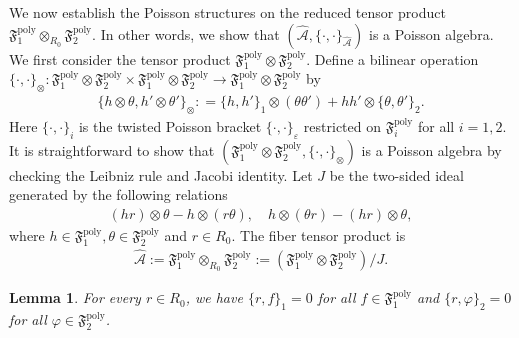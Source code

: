 \documentclass[11pt]{amsart}
\newtheorem{lemma}[theorem]{Lemma}
\theoremstyle{definition}
\theoremstyle{plain}
\theoremstyle{conclusion}
\begin{document}
We now establish the Poisson structures on the reduced tensor product $\mathfrak{F}_1^{\mathrm{poly}} \otimes_{R_0} \mathfrak{F}_2^{\mathrm{poly}}$. In other words, we show that $(\widehat{\mathcal{A}},\{\cdot,\cdot\}_{\widehat{\mathcal{A}}})$ is a Poisson algebra. We first consider the tensor product $\mathfrak{F}_1^{\mathrm{poly}} \otimes \mathfrak{F}_2^{\mathrm{poly}}$. Define a bilinear operation  $ \{\cdot,\cdot\}_{\otimes}:  \mathfrak{F}_1^{\mathrm{poly}} \otimes \mathfrak{F}_2^{\mathrm{poly}} \times \mathfrak{F}_1^{\mathrm{poly}} \otimes \mathfrak{F}_2^{\mathrm{poly}} \rightarrow \mathfrak{F}_1^{\mathrm{poly}} \otimes \mathfrak{F}_2^{\mathrm{poly}}$   by \begin{align*}
    \{ h \otimes \theta,h' \otimes \theta'\}_\otimes : = \{h,h'\}_1 \otimes (\theta \theta' ) +  hh' \otimes \{\theta,\theta'\}_2. 
\end{align*} Here $\{\cdot,\cdot\}_i$ is the twisted Poisson bracket $\{\cdot,\cdot\}_\varepsilon$ restricted on $\mathfrak{F}_i^{\mathrm{poly}}$ for all $i =1,2$. %
It is straightforward to show that $\left(\mathfrak{F}_1^{\mathrm{poly}} \otimes \mathfrak{F}_2^{\mathrm{poly}}, \{\cdot,\cdot\}_\otimes\right)$ is a Poisson algebra by checking the Leibniz rule and Jacobi identity. Let $J$ be the two-sided ideal generated by the following relations \begin{align}
    (hr) \otimes \theta - h \otimes (r \theta) , \quad  h \otimes (\theta r) - (hr )\otimes \theta,
\end{align} where $h \in \mathfrak{F}_1^{\mathrm{poly}},\theta \in \mathfrak{F}_2^{\mathrm{poly}} $ and $r \in R_0$.  The fiber tensor product is\begin{align*}
\widehat{\mathcal{A}}:=\mathfrak{F}_1^{\mathrm{poly}}\otimes_{R_0}\mathfrak{F}_2^{\mathrm{poly}}:=(\mathfrak{F}_1^{\mathrm{poly}}\otimes \mathfrak{F}_2^{\mathrm{poly}})/J.
\end{align*} 
\begin{lemma} \label{lem:factor-central}
For every $r\in R_0$, we have $\{r,f\}_1=0$ for all $f\in \mathfrak{F}_1^{\mathrm{poly}}$ and $\{r,\varphi\}_2=0$ for all $\varphi\in \mathfrak{F}_2^{\mathrm{poly}}$. 
\end{lemma}
\end{document}
